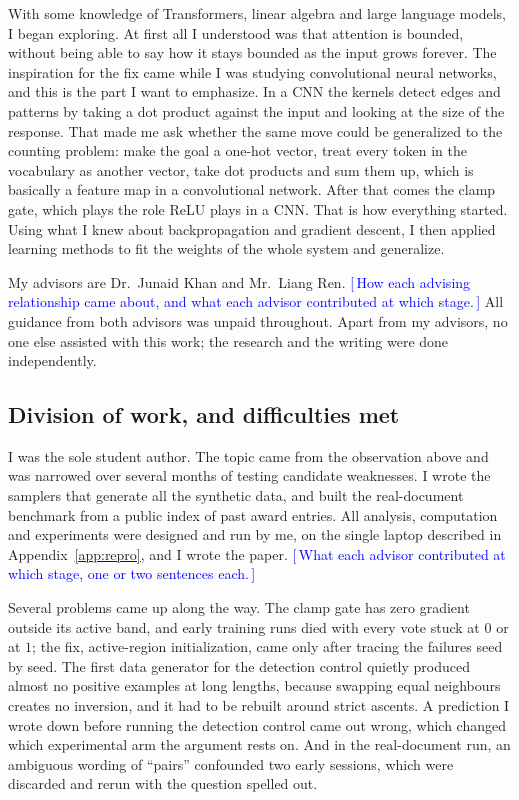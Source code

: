 \documentclass[10pt]{article}
\theoremstyle{definition}
\newcommand{\needwrite}[1]{\textcolor{blue}{[\,#1\,]}}
\begin{document}
With some knowledge of Transformers, linear algebra and large language
models, I began exploring. At first all I understood was that attention is
bounded, without being able to say how it stays bounded as the input grows
forever. The inspiration for the fix came while I was studying
convolutional neural networks, and this is the part I want to emphasize.
In a CNN the kernels detect edges and patterns by taking a dot product
against the input and looking at the size of the response. That made me
ask whether the same move could be generalized to the counting problem:
make the goal a one-hot vector, treat every token in the vocabulary as
another vector, take dot products and sum them up, which is basically a
feature map in a convolutional network. After that comes the clamp gate,
which plays the role ReLU plays in a CNN. That is how everything started.
Using what I knew about backpropagation and gradient descent, I then
applied learning methods to fit the weights of the whole system and
generalize.

My advisors are Dr.\ Junaid Khan and Mr.\ Liang Ren. \needwrite{How each
advising relationship came about, and what each advisor contributed at
which stage.} All guidance from both advisors was unpaid throughout. Apart
from my advisors, no one else assisted with this work; the research and
the writing were done independently.

\subsection*{Division of work, and difficulties met}

I was the sole student author. The topic came from the observation above
and was narrowed over several months of testing candidate weaknesses. I
wrote the samplers that generate all the synthetic data, and built the
real-document benchmark from a public index of past award entries. All
analysis, computation and experiments were designed and run by me, on the
single laptop described in Appendix~\ref{app:repro}, and I wrote the
paper. \needwrite{What each advisor contributed at which stage, one or
two sentences each.}

Several problems came up along the way. The clamp gate has zero gradient
outside its active band, and early training
runs died with every vote stuck at $0$ or at $1$; the fix, active-region
initialization, came only after tracing the failures seed by seed. The
first data generator for the detection control quietly produced almost no
positive examples at long lengths, because swapping equal neighbours
creates no inversion, and it had to be rebuilt around strict ascents. A
prediction I wrote down before running the detection control came out
wrong, which changed which experimental arm the argument rests on. And in
the real-document run, an ambiguous wording of ``pairs'' confounded two
early sessions, which were discarded and rerun with the question spelled
out.
\end{document}
